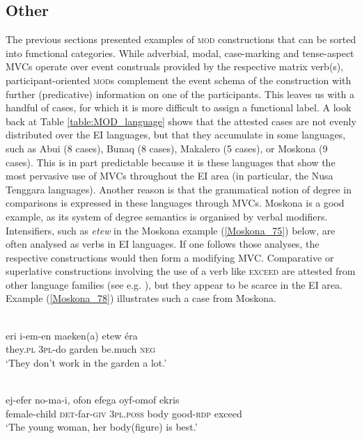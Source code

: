 \subsection{Other}

The previous sections presented examples of \textsc{mod} constructions that can be sorted into functional categories. While adverbial, modal, case-marking and tense-aspect MVCs operate over event construals provided by the respective matrix verb(s), participant-oriented \textsc{mod}s complement the event schema of the construction with further (predicative) information on one of the participants. This leaves us with a handful of cases, for which it is more difficult to assign a functional label. A look back at Table \ref{table:MOD_language} shows that the attested cases are not evenly distributed over the EI languages, but that they accumulate in some languages, such as Abui (8 cases), Bunaq (8 cases), Makalero (5 cases), or Moskona (9 cases). This is in part predictable because it is these languages that show the most pervasive use of MVCs throughout the EI area (in particular, the Nusa Tenggara languages). Another reason is that the grammatical notion of degree in comparisons is expressed in these languages through MVCs. Moskona is a good example, as its system of degree semantics is organised by verbal modifiers. Intensifiers, such as \textit{etew} in the Moskona example (\ref{Moskona_75}) below, are often analysed as verbs in EI languages. If one follows those analyses, the respective constructions would then form a modifying MVC. Comparative or superlative constructions involving the use of a verb like \textsc{exceed} are attested from other language families (see e.g. \citealt{Aikhenvald2006}), but they appear to be scarce in the EI area. Example (\ref{Moskona_78}) illustrates such a case from Moskona.

\ea \label{Moskona_75}
\\
\gll eri i-em-en maeken(a) etew éra \\
they.\textsc{pl} 3\textsc{pl}-do garden be.much \textsc{neg} \\
\glft `They don’t work in the garden a lot.’ \\ 
\z

\ea \label{Moskona_78}
\\
\gll ej-efer no-ma-i, ofon efega oyf-omof ekris \\
female-child \textsc{det}-far-\textsc{giv} 3\textsc{pl}.\textsc{poss} body good-\textsc{rdp} exceed \\
\glft `The young woman, her body(figure) is best.'\\ 
\z

